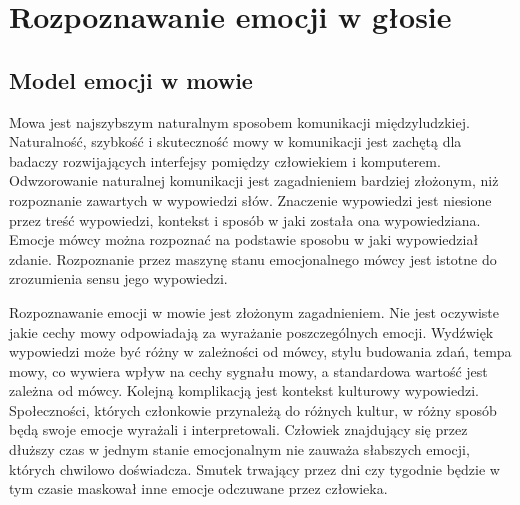 \documentclass[a4paper,12pt,twoside,openany]{report}
\newcommand*\NewPage{\newpage\null\thispagestyle{empty}\newpage}
\begin{document}
\NewPage
\chapter{Rozpoznawanie emocji w głosie}
\section{Model emocji w mowie}
Mowa jest najszybszym naturalnym sposobem komunikacji międzyludzkiej.
Naturalność, szybkość i skuteczność mowy w komunikacji jest zachętą dla badaczy rozwijających interfejsy pomiędzy człowiekiem i komputerem. 
Odwzorowanie naturalnej komunikacji jest zagadnieniem bardziej złożonym, niż rozpoznanie zawartych w wypowiedzi słów.
Znaczenie wypowiedzi jest niesione przez treść wypowiedzi, kontekst i sposób w jaki została ona wypowiedziana.
Emocje mówcy można rozpoznać na podstawie sposobu w jaki wypowiedział zdanie.
Rozpoznanie przez maszynę stanu emocjonalnego mówcy jest istotne do zrozumienia sensu jego wypowiedzi.

Rozpoznawanie emocji w mowie jest złożonym zagadnieniem.
Nie jest oczywiste jakie cechy mowy odpowiadają za wyrażanie poszczególnych emocji.
Wydźwięk wypowiedzi może być różny w zależności od mówcy, stylu budowania zdań, tempa mowy, co wywiera wpływ na cechy sygnału mowy, a standardowa wartość jest zależna od mówcy.
Kolejną komplikacją jest kontekst kulturowy wypowiedzi. 
Społeczności, których członkowie przynależą do różnych kultur, w różny sposób będą swoje emocje wyrażali i interpretowali.
Człowiek znajdujący się przez dłuższy czas w jednym stanie emocjonalnym nie zauważa słabszych emocji, których chwilowo doświadcza.
Smutek trwający przez dni czy tygodnie będzie w tym czasie maskował inne emocje odczuwane przez człowieka.
\end{document}
